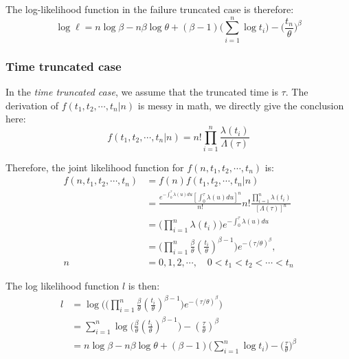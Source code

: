 \documentclass[12pt]{book}
\numberwithin{equation}{chapter}
\begin{document}
The log-likelihood function in the failure truncated case is therefore:
\[\log \ell = n\log\beta - n\beta\log\theta + (\beta - 1)\bigg(\sum_{i=1}^n\log t_i\bigg) - \Big(\frac{t_n}{\theta}\Big)^\beta\]

\hypertarget{time-truncated-case}{%
\subsubsection{Time truncated case}\label{time-truncated-case}}

In the \emph{time truncated case}, we assume that the truncated time is \(\tau\). The derivation of \(f(t_1, t_2, \cdots, t_n|n)\) is messy in math, we directly give the conclusion here: \[f(t_1, t_2, \cdots, t_n|n) = n!\prod_{i=1}^n\frac{\lambda(t_i)}{\Lambda(\tau)}\]

Therefore, the joint likelihood function for \(f(n, t_1, t_2, \cdots, t_n)\) is:
\begin{equation}\label{pdftau}
\begin{aligned}
f(n, t_1, t_2, \cdots, t_n) & = f(n)f(t_1, t_2, \cdots, t_n|n)\\
& = \frac{e^{-\int_0^\tau \lambda(u)du}[\int_0^\tau \lambda(u)du]^n}{n!}n!\frac{\prod_{i=1}^n\lambda(t_i)}{[\Lambda(\tau)]^n}\\
& = \Big(\prod_{i=1}^n\lambda(t_i) \Big)e^{-\int_0^\tau \lambda(u)du}\\
& = \Big(\prod_{i=1}^n\frac{\beta}{\theta}(\frac{t_i}{\theta})^{\beta - 1} \Big)e^{-(\tau/\theta)^\beta},\\ 
n & = 0, 1, 2, \cdots, \quad  0 < t_1 < t_2 < \cdots < t_n
\end{aligned}
\end{equation}

The log likelihood function \(l\) is then:
\begin{equation}\label{logtau}
\begin{aligned}
l & = \log \Bigg(\Big(\prod_{i=1}^n\frac{\beta}{\theta}(\frac{t_i}{\theta})^{\beta - 1}\Big)e^{-(\tau/\theta)^\beta}\Bigg)\\
& = \sum_{i=1}^n\log\Big(\frac{\beta}{\theta}(\frac{t_i}{\theta})^{\beta - 1}\Big) - (\frac{\tau}{\theta})^\beta\\
& = n\log\beta - n\beta\log\theta + (\beta - 1)\bigg(\sum_{i=1}^n\log t_i\bigg) - \Big(\frac{\tau}{\theta}\Big)^\beta
\end{aligned}
\end{equation}

\cleardoublepage
\end{document}
